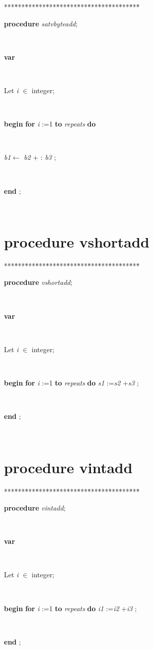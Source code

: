 \documentclass[10pt, a4paper]{article}
\begin{document}
\begin{tabbing}
***\=***\=***\=***\=***\=***\=***\=***\=***\=***\=***\=***\=***\=\kill
\parbox{14cm}{\textsf {\textbf {procedure } \textsf{\textit{satvbyteadd}}; }}\\
\+\parbox{14cm}{\textsf{\textbf{var} }}\\
\parbox{14cm}{\textsf{Let \textit{i} $\in$ integer;}}\\
\+\<\parbox{14cm}{\textsf{\textbf{begin}      \textbf{for}  \textit{i} :=1 \textbf{to}  \textit{repeats}  \textbf{do} }}\\
\parbox{14cm}{\textsf{\textit{b1}$\leftarrow$ \textit{b2} +  :  \textit{b3} }; }\\
\<\-\parbox{14cm}{\textsf{\textbf{end} ;}}\\
\end{tabbing}
\section{procedure vshortadd}\label{sec:vectest/dovectestvshortadd}

\begin{tabbing}
***\=***\=***\=***\=***\=***\=***\=***\=***\=***\=***\=***\=***\=\kill
\parbox{14cm}{\textsf {\textbf {procedure } \textsf{\textit{vshortadd}}; }}\\
\+\parbox{14cm}{\textsf{\textbf{var} }}\\
\parbox{14cm}{\textsf{Let \textit{i} $\in$ integer;}}\\
\-\<\+\parbox{14cm}{\textsf{\textbf{begin}      \textbf{for}  \textit{i} :=1 \textbf{to}  \textit{repeats}  \textbf{do}  \textit{s1} :=\textit{s2} +\textit{s3} ;}}\\
\<\-\parbox{14cm}{\textsf{\textbf{end} ;}}\\
\end{tabbing}
\section{procedure vintadd}\label{sec:vectest/dovectestvintadd}

\begin{tabbing}
***\=***\=***\=***\=***\=***\=***\=***\=***\=***\=***\=***\=***\=\kill
\parbox{14cm}{\textsf {\textbf {procedure } \textsf{\textit{vintadd}}; }}\\
\+\parbox{14cm}{\textsf{\textbf{var} }}\\
\parbox{14cm}{\textsf{Let \textit{i} $\in$ integer;}}\\
\-\<\+\parbox{14cm}{\textsf{\textbf{begin}      \textbf{for}  \textit{i} :=1 \textbf{to}  \textit{repeats}  \textbf{do}  \textit{i1} :=\textit{i2} +\textit{i3} ;}}\\
\<\-\parbox{14cm}{\textsf{\textbf{end} ;}}\\
\end{tabbing}
\end{document}
